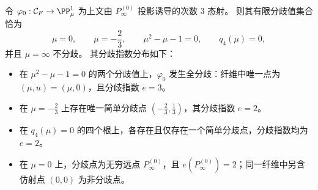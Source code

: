 \begin{theorem}\label{thm:fold-gauge-anomaly-trigonal-ramification-mu}
令 \(\varphi_0:\mathcal C_F\to\PP^1_{\mu}\) 为上文由 \(P_\infty^{(0)}\) 投影诱导的次数 \(3\) 态射。
则其有限分歧值集合恰为
\[
\mu=0,\qquad \mu=-\frac23,\qquad \mu^{2}-\mu-1=0,\qquad q_{4}(\mu)=0,
\]
并且 \(\mu=\infty\) 不分歧。
其分歧指数分布如下：
\begin{itemize}
  \item 在 \(\mu^{2}-\mu-1=0\) 的两个分歧值上，\(\varphi_0\) 发生全分歧：纤维中唯一点为 \((\mu,u)=(\mu,0)\)，且分歧指数 \(e=3\)。
  \item 在 \(\mu=-\tfrac23\) 上存在唯一简单分歧点 \((-\tfrac23,\tfrac13)\)，其分歧指数 \(e=2\)。
  \item 在 \(q_4(\mu)=0\) 的四个根上，各存在且仅存在一个简单分歧点，分歧指数均为 \(e=2\)。
  \item 在 \(\mu=0\) 上，分歧点为无穷远点 \(P_\infty^{(0)}\)，且 \(e(P_\infty^{(0)})=2\)；同一纤维中另含仿射点 \((0,0)\) 为非分歧点。
\end{itemize}
\end{theorem}
